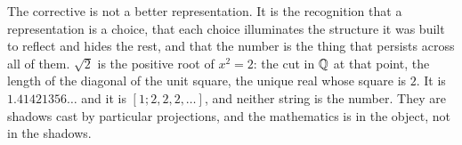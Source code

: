 \documentclass{essay}
\begin{document}
The corrective is not a better representation. It is the recognition that a
representation is a choice, that each choice illuminates the structure it was
built to reflect and hides the rest, and that the number is the thing that
persists across all of them. \(\sqrt{2}\) is the positive root of \(x^{2} = 2\): the
cut in \(\mathbb{Q}\) at that point, the length of the diagonal of the unit square, the
unique real whose square is \(2\). It is \(1.41421356\ldots\) and it is
\([1;2,2,2,\ldots]\), and neither string is the number. They are shadows cast by
particular projections, and the mathematics is in the object, not in the
shadows.
\end{document}
